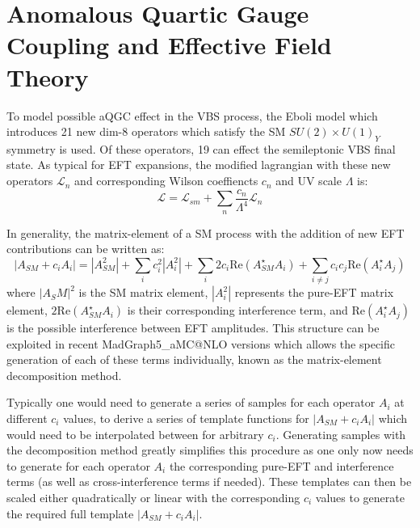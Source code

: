 \section{Anomalous Quartic Gauge Coupling and Effective Field Theory}

To model possible aQGC effect in the VBS process, the Eboli model \cite{eboli2006p} which introduces 21 new dim-8 operators which satisfy the SM $SU(2)\times U(1)_Y$ symmetry is used.
Of these operators, 19 can effect the semileptonic VBS final state.
As typical for EFT expansions, the modified lagrangian with these new operators $\mathcal{L}_n$ and corresponding Wilson coeffiencts $c_n$ and UV scale $\Lambda$ is:
\begin{equation*}
  \mathcal{L}=\mathcal{L}_{sm}+\sum_{n}\frac{c_n}{\Lambda^{4}}\mathcal{L}_n
\end{equation*}

In generality, the matrix-element of a SM process with the addition of new EFT contributions can be written as:
\begin{equation}
  |A_{SM}+c_iA_i|=|A_{SM}^2|+\sum\limits_i c_i^2|A_{i}^2|+ \sum\limits_i 2 c_i \mathrm{Re}(A_{SM}^\star A_i) +\sum\limits_{i\neq j} c_i c_j \mathrm{Re}(A_i^\star A_j)
\end{equation}
where $|A_SM|^2$ is the SM matrix element, $|A_{i}^2|$ represents the pure-EFT matrix element, $2 \mathrm{Re}(A_{SM}^\star A_i)$ is their corresponding interference term, and $\mathrm{Re}(A_i^\star A_j)$ is the possible interference between EFT amplitudes.
This structure can be exploited in recent MadGraph5\_aMC@NLO versions which allows the specific generation of each of these terms individually, known as the matrix-element decomposition method.

Typically one would need to generate a series of samples for each operator $A_i$ at different $c_i$ values, to derive a series of template functions for $|A_{SM}+c_iA_i|$ which would need to be interpolated between for arbitrary $c_i$. Generating samples with the decomposition method greatly simplifies this procedure as one only now needs to generate for each operator $A_i$ the corresponding pure-EFT and interference terms (as well as cross-interference terms if needed). These templates can then be scaled either quadratically or linear with the corresponding $c_i$ values to generate the required full template $|A_{SM}+c_iA_i|$.

